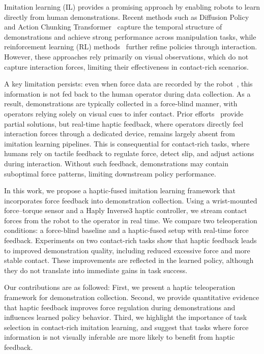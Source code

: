 \documentclass[letterpaper, 10 pt, conference]{ieeeconf}  %
\begin{document}
Imitation learning (IL) provides a promising approach by enabling robots to learn directly from human demonstrations. Recent methods such as Diffusion Policy~\cite{chi2024diffusionpolicy} and Action Chunking Transformer~\cite{zhao2023act} capture the temporal structure of demonstrations and achieve strong performance across manipulation tasks, while reinforcement learning (RL) methods~\cite{luo2024serl,luo2024hilserl,rajeswaran2018dexterous} further refine policies through interaction. However, these approaches rely primarily on visual observations, which do not capture interaction forces, limiting their effectiveness in contact-rich scenarios.

A key limitation persists: even when force data are recorded by the robot~\cite{shukla2025forcevisuomotor, he2025foar, helmut2025tactile}, this information is not fed back to the human operator during data collection. As a result, demonstrations are typically collected in a force-blind manner, with operators relying solely on visual cues to infer contact. Prior efforts~\cite{zhao2023act, liu2025forcemimic, xue2025rdp} provide partial solutions, but real-time haptic feedback, where operators directly feel interaction forces through a dedicated device, remains largely absent from imitation learning pipelines. This is consequential for contact-rich tasks, where humans rely on tactile feedback to regulate force, detect slip, and adjust actions during interaction. Without such feedback, demonstrations may contain suboptimal force patterns, limiting downstream policy performance.

In this work, we propose a haptic-fused imitation learning framework that incorporates force feedback into demonstration collection. Using a wrist-mounted force–torque sensor and a Haply Inverse3 haptic controller, we stream contact forces from the robot to the operator in real time. We compare two teleoperation conditions: a force-blind baseline and a haptic-fused setup with real-time force feedback. Experiments on two contact-rich tasks show that haptic feedback leads to improved demonstration quality, including reduced excessive force and more stable contact. These improvements are reflected in the learned policy, although they do not translate into immediate gains in task success.

Our contributions are as followed: First, we present a haptic teleoperation framework for demonstration collection. Second, we provide quantitative evidence that haptic feedback improves force regulation during demonstrations and influences learned policy behavior. Third, we highlight the importance of task selection in contact-rich imitation learning, and suggest that tasks where force information is not visually inferable are more likely to benefit from haptic feedback.
\end{document}
